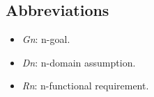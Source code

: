 \subsection{Abbreviations}
	\begin{itemize}
   	\item \textit{Gn}: n-goal. 
   	\item \textit{Dn}: n-domain assumption.
   	\item \textit{Rn}: n-functional requirement. 
	\end{itemize}